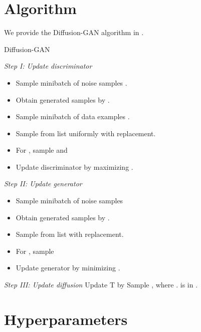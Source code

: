 \documentclass{article} \usepackage{iclr2023_conference,times}
\theoremstyle{plain}
\theoremstyle{definition}
\theoremstyle{remark}
\begin{document}
\section{Algorithm} \label{sec:appendix_algo}

We provide the Diffusion-GAN algorithm in .

\begin{algorithm}[t]
  \caption{\small Diffusion-GAN} 
  \label{alg:algo}
  
  \begin{algorithmic}
        \STATE \textit{Step I: Update discriminator}
        \begin{itemize}
            \item Sample minibatch of  noise samples .
            \item Obtain generated samples  by .
            \item Sample minibatch of  data examples .
            \item Sample  from  list uniformly with replacement. 
            \item For , sample  and 
            \item Update discriminator by maximizing . 
        \end{itemize}
        \STATE
        \STATE \textit{Step II: Update generator}
        \begin{itemize}
            \item Sample minibatch of  noise samples 
            \item Obtain generated samples  by .
            \item Sample  from  list with replacement. 
            \item For , sample 
            \item Update generator by minimizing . 
        \end{itemize}
        \STATE
        \STATE \textit{Step III: Update diffusion}
        \STATE Update T by 
        \STATE Sample , where .  is in . 
        \ENDIF
    \ENDWHILE
  \end{algorithmic}
\end{algorithm}

\section{Hyperparameters} \label{sec:hyperparameter}
\end{document}
